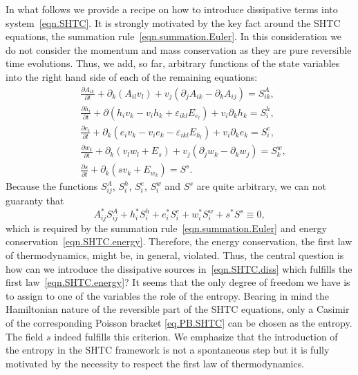 \documentclass[twoside]{article}
\newcommand{\ted}{E} %
\newcommand{\pd}{\partial}
\newcommand{\eps}{\varepsilon}
\begin{document}
In what follows we provide a recipe on how to introduce dissipative terms into 
system~\eqref{eqn.SHTC}. It is strongly motivated by the key fact around the 
SHTC equations, the summation rule~\eqref{eqn.summation.Euler}. In this 
consideration we do not consider the momentum and mass conservation as they are 
pure reversible time evolutions. Thus, we add, so far, arbitrary functions 
of the state variables into the right hand side of each of the  remaining 
equations:
\begin{subequations}\label{eqn.SHTC.diss}
	\begin{align}
	&\frac{\pd A_{i k}}{\pd t}+\pd_k (A_{il} 
	v_l) + v_j(\pd_j A_{ik} - \pd_k A_{ij})
	= S^A_{ik},\label{eqn.SHTC.diss.deformation}\\[1mm]
	&\frac{\pd h_i}{\pd t} + \pd ( h_i v_k - v_i h_k + \eps_{ikl} \ted_{e_l} ) 
	+ v_i\pd_k h_k = S^h_i, \label{eqn.SHTC.diss.Hfield}\\[1mm]
	&\frac{\pd e_i}{\pd t} +  \pd_k ( e_i v_k - v_i e_k - \eps_{ikl} 
	\ted_{h_l}) + v_i\pd_k e_k = S^e_i, 
	\label{eqn.SHTC.diss.Efield}\\[1mm]
	&\frac{\pd w_k}{\pd t} + \pd_k (v_l w_l + \ted_{s}) + v_j(\pd_j	w_k - \pd_k 
	w_j) = S^w_k,
	\label{eqn.SHTC.diss.heatflux}\\[1mm]
	&\frac{\pd s}{\pd t} + \pd_k (s v_k + \ted_{w_k} ) = S^s.
	\label{eqn.SHTC.diss.entropy}
	\end{align}
\end{subequations}
Because the functions $ S^A_{ij} $, $ S^h_i $, $ S^e_i $, $ S^w_i $ and $ S^s $ 
are quite arbitrary, we can not guaranty that
\begin{equation}\label{eqn.summation.source}
A_{ij}^* S^A_{ij} + h_i^*S^h_i + e_i^* S^e_i + w_i^*S^w_i  + s^*S^s \equiv 0,
\end{equation}
which is required by the summation rule~\eqref{eqn.summation.Euler} and energy 
conservation~\eqref{eqn.SHTC.energy}. Therefore, 
the energy conservation, the first law of thermodynamics, might be, in general, 
violated. Thus, the central question is  how can we introduce the dissipative 
sources in~\eqref{eqn.SHTC.diss} which fulfills the first 
law~\eqref{eqn.SHTC.energy}? It seems that 
the 
only degree of freedom 
we have is to assign to one 
of the variables the role of the entropy. Bearing in mind the 
Hamiltonian nature of the reversible part of the SHTC equations, only a Casimir 
of the corresponding Poisson bracket \eqref{eq.PB.SHTC} can be chosen as the 
entropy. The field $s$ indeed fulfills this criterion.
We emphasize that the introduction of the entropy in the SHTC framework 
is not a spontaneous 
step but it is fully motivated by the necessity to respect the  first law of 
thermodynamics.
\end{document}
